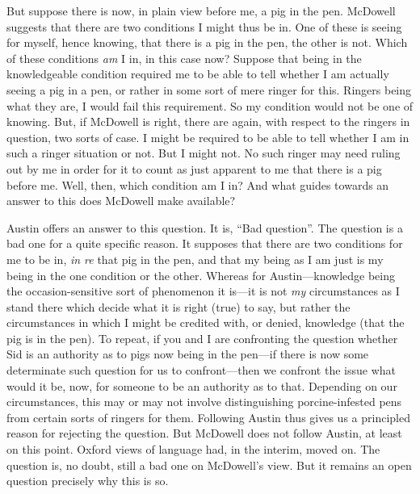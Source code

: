 But suppose there is now, in plain view before me, a pig in the pen. McDowell suggests that there are two conditions I might thus be in. One of these is seeing for myself, hence knowing, that there is a pig in the pen, the other is not. Which of these conditions \emph{am} I in, in this case now? Suppose that being in the knowledgeable condition required me to be able to tell whether I am actually seeing a pig in a pen, or rather in some sort of mere ringer for this. Ringers being what they are, I would fail this requirement. So my condition would not be one of knowing. But, if McDowell is right, there are again, with respect to the ringers in question, two sorts of case. I might be required to be able to tell whether I am in such a ringer situation or not. But I might not. No such ringer may need ruling out by me in order for it to count as just apparent to me that there is a pig before me. Well, then, which condition am I in? And what guides towards an answer to this does McDowell make available?

Austin offers an answer to this question. It is, ``Bad question''. The question is a bad one for a quite specific reason. It supposes that there are two conditions for me to be in, \emph{in re} that pig in the pen, and that my being as I am just is my being in the one condition or the other. Whereas for Austin---knowledge being the occasion-sensitive sort of phenomenon it is---it is not \emph{my} circumstances as I stand there which decide what it is right (true) to say, but rather the circumstances in which I might be credited with, or denied, knowledge (that the pig is in the pen). To repeat, if you and I are confronting the question whether Sid is an authority as to pigs now being in the pen---if there is now some determinate such question for us to confront---then we confront the issue what would it be, now, for someone to be an authority as to that. Depending on our circumstances, this may or may not involve distinguishing porcine-infested pens from certain sorts of ringers for them. Following Austin thus gives us a principled reason for rejecting the question. But McDowell does not follow Austin, at least on this point. Oxford views of language had, in the interim, moved on. The question is, no doubt, still a bad one on McDowell’s view. But it remains an open question precisely why this is so.
